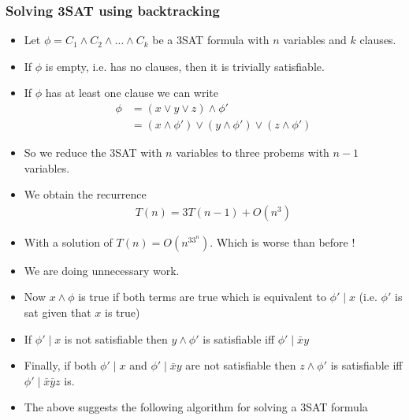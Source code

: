 \documentclass{beamer}
\newcommand{\given}[0]{\ensuremath{\!\mid\!}}
\begin{document}
\begin{frame}[fragile]
  \frametitle{Solving 3SAT using backtracking}
  \begin{itemize}
  \item Let $\phi=C_1\wedge C_2\wedge\ldots\wedge C_k$ be a 3SAT formula with $n$ variables
   and $k$ clauses.
  \item If $\phi$ is empty, i.e. has no clauses, then it is trivially satisfiable.
  \item If $\phi$ has at least one clause we can write
    \begin{align*}
      \phi&=(x\vee y\vee z)\wedge \phi'\\
          &=(x\wedge\phi')\vee (y\wedge\phi')\vee (z\wedge\phi')
    \end{align*}
  \item So we reduce the 3SAT with $n$ variables to three probems with $n-1$ variables.
  \item We obtain the recurrence
  \begin{align*}
    T(n)=3T(n-1)+O(n^3)
  \end{align*}
  \item With a solution of $T(n)=O(n^33^n)$. Which is worse than before !
  \end{itemize}
\end{frame}
\begin{frame}
  \begin{itemize}
    \item We are doing unnecessary work.
\item Now $x\wedge\phi$ is true if both terms are true which is equivalent to $\phi'\given x$
(i.e. $\phi'$ is sat given that $x$ is true)
\item If $\phi'\given x$ is not satisfiable then $y\wedge\phi'$ is satisfiable 
iff $\phi'\given\bar{x}y$
\item Finally, if both $\phi'\given x$ and $\phi'\given \bar{x}y$ are not satisfiable then 
$z\wedge\phi'$  is satisfiable iff $\phi'\given \bar{x}\bar{y}z$ is.
\item The above suggests the following algorithm for solving a 3SAT formula
  \end{itemize}
\end{frame}
\end{document}
